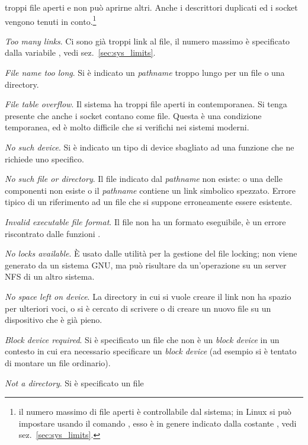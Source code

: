 \begin{basedescript}{\desclabelwidth{1.5cm}\desclabelstyle{\nextlinelabel}}
  troppi file aperti e non può aprirne altri. Anche i descrittori duplicati ed
  i socket vengono tenuti in conto.\footnote{il numero massimo di file aperti
    è controllabile dal sistema; in Linux si può impostare usando il comando
    , esso è in genere indicato dalla costante ,
    vedi sez.~\ref{sec:sys_limits}.}
\item[\errcode{EMLINK} \textit{Too many links}.] Ci sono già troppi link al
  file, il numero massimo è specificato dalla variabile ,
  vedi sez.~\ref{sec:sys_limits}.
\item[\errcode{ENAMETOOLONG} \textit{File name too long}.] Si è indicato un
  \textit{pathname} troppo lungo per un file o una directory.
\item[\errcode{ENFILE} \textit{File table overflow}.] Il sistema ha troppi
  file aperti in contemporanea. Si tenga presente che anche i socket contano
  come file. Questa è una condizione temporanea, ed è molto difficile che si
  verifichi nei sistemi moderni.
\item[\errcode{ENODEV} \textit{No such device}.] Si è indicato un tipo di
  device sbagliato ad una funzione che ne richiede uno specifico.
\item[\errcode{ENOENT} \textit{No such file or directory}.] Il file indicato
  dal \textit{pathname} non esiste: o una delle componenti non esiste o il
  \textit{pathname} contiene un link simbolico spezzato.  Errore tipico di un
  riferimento ad un file che si suppone erroneamente essere esistente.
\item[\errcode{ENOEXEC} \textit{Invalid executable file format}.] Il file non
  ha un formato eseguibile, è un errore riscontrato dalle funzioni
  .
\item[\errcode{ENOLCK} \textit{No locks available}.] È usato dalle utilità per
  la gestione del file locking; non viene generato da un sistema GNU, ma può
  risultare da un'operazione su un server NFS di un altro sistema.
\item[\errcode{ENOSPC} \textit{No space left on device}.] La directory in cui
  si vuole creare il link non ha spazio per ulteriori voci, o si è cercato di
  scrivere o di creare un nuovo file su un dispositivo che è già pieno.
\item[\errcode{ENOTBLK} \textit{Block device required}.] Si è specificato un
  file che non è un \textit{block device} in un contesto in cui era necessario
  specificare un \textit{block device} (ad esempio si è tentato di montare un
  file ordinario).
\item[\errcode{ENOTDIR} \textit{Not a directory}.] Si è specificato un file

\end{basedescript}
